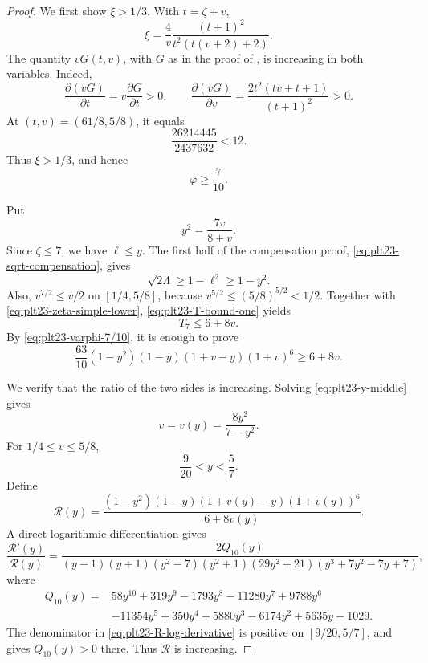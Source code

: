 \documentclass[11pt]{article}
\numberwithin{equation}{section}
\begin{document}
\begin{proof}
  We first show $\xi>1/3$.  With $t=\zeta+v$,
  \[
    \xi=\frac{4}{v}\frac{(t+1)^2}{t^2(t(v+2)+2)}.
  \]
  The quantity $vG(t,v)$, with $G$ as in the proof of
  , is increasing in both variables.  Indeed,
  \[
    \frac{\partial(vG)}{\partial t}=v\frac{\partial G}{\partial t}>0,
    \qquad
    \frac{\partial(vG)}{\partial v}
    =\frac{2t^2(tv+t+1)}{(t+1)^2}>0.
  \]
  At
  $(t,v)=(61/8,5/8)$, it equals
  \[
    \frac{26214445}{2437632}<12.
  \]
  Thus $\xi>1/3$, and hence
  \begin{equation}\label{eq:plt23-varphi-7/10}
    \varphi\ge\frac{7}{10}.
  \end{equation}

  Put
  \begin{equation}\label{eq:plt23-y-middle}
    y^2=\frac{7v}{8+v}.
  \end{equation}
  Since $\zeta\le7$, we have $\ell\le y$.  The first half of the
  compensation proof, \eqref{eq:plt23-sqrt-compensation}, gives
  \[
    \sqrt{2\Lambda}\ge1-\ell^2\ge1-y^2.
  \]
  Also, $v^{7/2}\le v/2$ on $[1/4,5/8]$, because
  $v^{5/2}\le(5/8)^{5/2}<1/2$.  Together with
  \eqref{eq:plt23-zeta-simple-lower}, \eqref{eq:plt23-T-bound-one} yields
  \begin{equation}\label{eq:plt23-T7-middle}
    T_7\le6+8v.
  \end{equation}
  By \eqref{eq:plt23-varphi-7/10}, it is enough to prove
  \begin{equation}\label{eq:plt23-middle-target}
    \frac{63}{10}(1-y^2)(1-y)(1+v-y)(1+v)^6
    \ge6+8v.
  \end{equation}

  We verify that the ratio of the two sides is increasing.  Solving
  \eqref{eq:plt23-y-middle} gives
  \[
    v=v(y)=\frac{8y^2}{7-y^2}.
  \]
  For $1/4\le v\le5/8$,
  \[
    \frac{9}{20}<y<\frac{5}{7}.
  \]
  Define
  \[
    \mathcal R(y)=
    \frac{(1-y^2)(1-y)(1+v(y)-y)(1+v(y))^6}
    {6+8v(y)}.
  \]
  A direct logarithmic differentiation gives
  \begin{equation}\label{eq:plt23-R-log-derivative}
    \frac{\mathcal R'(y)}{\mathcal R(y)}
    =\frac{2Q_{10}(y)}
    {(y-1)(y+1)(y^2-7)(y^2+1)(29y^2+21)
    (y^3+7y^2-7y+7)},
  \end{equation}
  where
  \begin{align}
    Q_{10}(y)={}&58y^{10}+319y^9-1793y^8-11280y^7+9788y^6\\
    &-11354y^5+350y^4+5880y^3-6174y^2+5635y-1029.
    \label{eq:plt23-Q10}
  \end{align}
  The denominator in \eqref{eq:plt23-R-log-derivative} is positive on
  $[9/20,5/7]$, and  gives
  $Q_{10}(y)>0$ there.  Thus $\mathcal R$ is increasing.


\end{proof}
\end{document}
